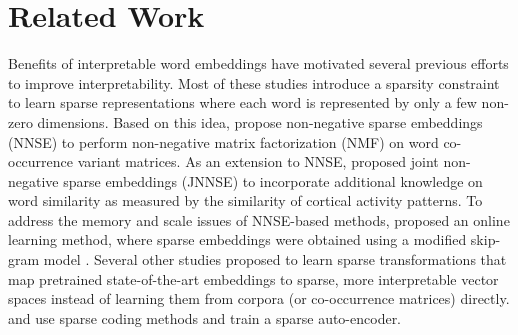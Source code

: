 \documentclass[11pt,a4paper]{article}
\begin{document}
\section{Related Work} \label{sec:related}

Benefits of interpretable word embeddings have motivated several previous efforts  to improve interpretability. Most of these studies introduce a sparsity constraint  to learn sparse representations where each word is represented by only a few non-zero dimensions. 
Based on this idea, \citet{murphy12nnse} propose non-negative sparse embeddings (NNSE)  to perform non-negative matrix factorization (NMF) on word co-occurrence variant matrices. As an extension to NNSE, \citet{fyshe14interpretable} proposed joint non-negative sparse embeddings (JNNSE) to incorporate additional knowledge on word similarity as measured by the similarity of cortical activity patterns. To address the memory and scale issues of NNSE-based methods, \citet{luo15online} proposed an online learning method, where sparse embeddings were obtained using a modified skip-gram model \citep{mikolov13word2vec_a}. Several other studies proposed to learn sparse transformations that map pretrained state-of-the-art embeddings to sparse, more interpretable vector spaces instead of learning them from corpora (or co-occurrence matrices) directly. \citet{arora18linalg} and \citet{faruqui15sparse} use sparse coding methods and \citep{subramanian18spine} train a sparse auto-encoder.

\end{document}
